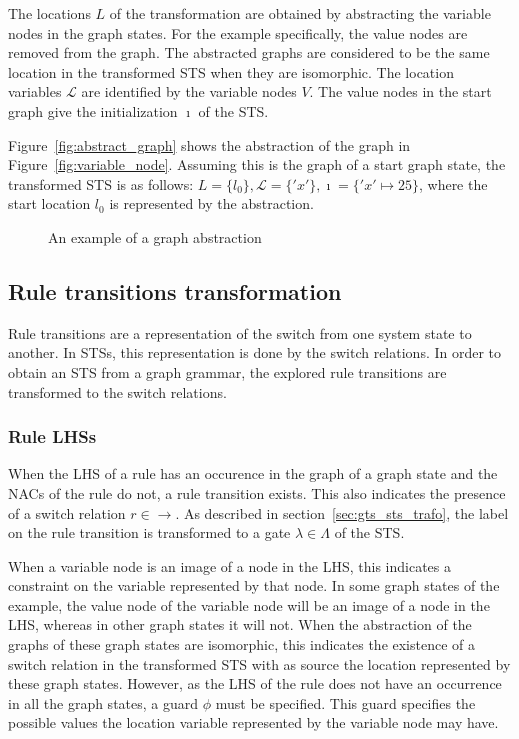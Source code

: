 The locations $L$ of the transformation are obtained by abstracting the variable nodes in the graph states. For the example specifically, the value nodes are removed from the graph. The abstracted graphs are considered to be the same location in the transformed STS when they are isomorphic. The location variables $\mathcal{L}$ are identified by the variable nodes $V$. The value nodes in the start graph give the initialization $\imath$ of the STS.

Figure~\ref{fig:abstract_graph} shows the abstraction of the graph in Figure~\ref{fig:variable_node}. Assuming this is the graph of a start graph state, the transformed STS is as follows: $L = \{l_0\}, \mathcal{L} = \{'x'\}, \imath = \{'x' \mapsto 25\}$, where the start location $l_0$ is represented by the abstraction.

\begin{figure}[ht]
  \begin{center}
    
  \end{center}
  \caption{An example of a graph abstraction}
\end{figure}

\subsection{Rule transitions transformation}
Rule transitions are a representation of the switch from one system state to another. In STSs, this representation is done by the switch relations. In order to obtain an STS from a graph grammar, the explored rule transitions are transformed to the switch relations.

\subsubsection{Rule LHSs}\label{sec:rule_lhss}
When the LHS of a rule has an occurence in the graph of a graph state and the NACs of the rule do not, a rule transition exists. This also indicates the presence of a switch relation $r \in \rightarrow$. As described in section~\ref{sec:gts_sts_trafo}, the label on the rule transition is transformed to a gate $\lambda \in \Lambda$ of the STS.

When a variable node is an image of a node in the LHS, this indicates a constraint on the variable represented by that node. In some graph states of the example, the value node of the variable node will be an image of a node in the LHS, whereas in other graph states it will not. When the abstraction of the graphs of these graph states are isomorphic, this indicates the existence of a switch relation in the transformed STS with as source the location represented by these graph states. However, as the LHS of the rule does not have an occurrence in all the graph states, a guard $\phi$ must be specified. This guard specifies the possible values the location variable represented by the variable node may have. 

